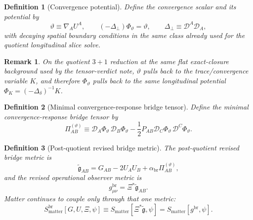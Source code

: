 \documentclass[11pt]{article}
\newcommand{\ReBridge}{\widetilde{\mathfrak{g}}}
\newcommand{\Proj}{\mathcal D}
\newcommand{\PiTheta}{\Pi^{(\vartheta)}}
\newtheorem{definition}{Definition}
\newtheorem{remark}{Remark}
\begin{document}
\begin{definition}[Convergence potential]
\label{def:potential}
Define the convergence scalar and its potential by
\begin{equation}
\vartheta \equiv \nabla_AU^A,
\qquad
(-\Delta_\perp)\Phi_\vartheta=\vartheta,
\qquad
\Delta_\perp\equiv \Proj^A\Proj_A,
\label{eq:potential}
\end{equation}
with decaying spatial boundary conditions in the same class already used for the quotient longitudinal slice solve.
\end{definition}

\begin{remark}
On the quotient \(3+1\) reduction at the same flat exact-closure background used by the tensor-verdict note, \(\vartheta\) pulls back to the trace/convergence variable \(K\), and therefore \(\Phi_\vartheta\) pulls back to the same longitudinal potential \(\Phi_K=(-\Delta_\delta)^{-1}K\).
\end{remark}

\begin{definition}[Minimal convergence-response bridge tensor]
\label{def:pitheta}
Define the \emph{minimal convergence-response bridge tensor} by
\begin{equation}
\PiTheta_{AB}
\equiv
\Proj_A\Phi_\vartheta\,\Proj_B\Phi_\vartheta
-\frac12 P_{AB}\Proj_C\Phi_\vartheta\,\Proj^C\Phi_\vartheta.
\label{eq:pitheta}
\end{equation}
\end{definition}

\begin{definition}[Post-quotient revised bridge metric]
\label{def:newbridge}
The \emph{post-quotient revised bridge metric} is
\begin{equation}
\ReBridge_{AB}
=
G_{AB}-2U_AU_B+\alpha_{\mathrm{br}}\PiTheta_{AB},
\label{eq:newbridge}
\end{equation}
and the revised operational observer metric is
\begin{equation}
g^{\mathrm{br}}_{\mu\nu}=\Xi^\ast\ReBridge_{AB}.
\label{eq:newobsmetric}
\end{equation}
Matter continues to couple only through that one metric:
\begin{equation}
S_{\mathrm{matter}}^{\mathrm{br}}[G,U,\Xi,\psi]
\equiv
S_{\mathrm{matter}}[\Xi^\ast\ReBridge,\psi]
=
S_{\mathrm{matter}}[g^{\mathrm{br}},\psi].
\label{eq:newmatter}
\end{equation}
\end{definition}
\end{document}
